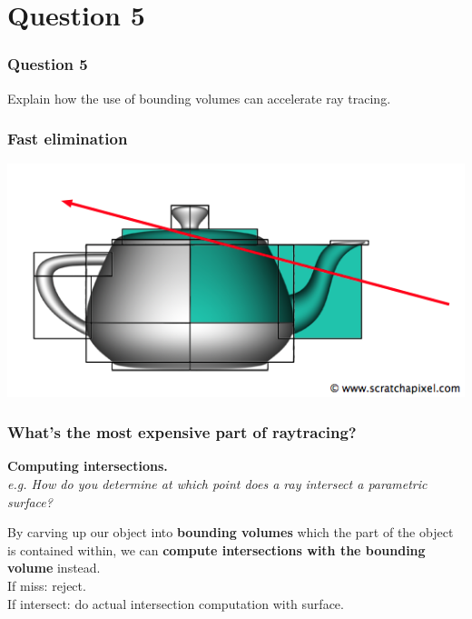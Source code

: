\documentclass{beamer}
\begin{document}
\section{Question 5}

\begin{frame}
    \frametitle{Question 5}
    Explain how the use of bounding volumes can accelerate ray tracing.
\end{frame}

\begin{frame}
    \frametitle{Fast elimination}

    \begin{center}
        \includegraphics[scale=0.6]{bbox.png}
    \end{center}

\end{frame}

\begin{frame}
    \frametitle{What's the most expensive part of raytracing?}

    \textbf{Computing intersections.} \\
    \textit{e.g. How do you determine at which point does a ray intersect a parametric surface?}

    \vspace{1em}

    \begin{tcolorbox}
        By carving up our object into \textbf{bounding volumes} which the part of the object
        is contained within, we can \textbf{compute intersections with the bounding volume} instead. \\

        If miss: reject.\\
        If intersect: do actual intersection computation with surface.
    \end{tcolorbox}

\end{frame}
\end{document}
